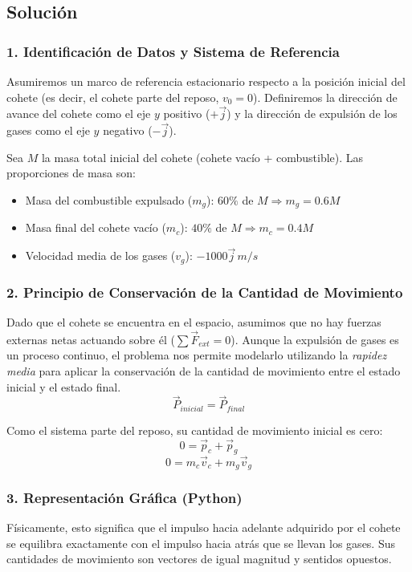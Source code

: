 \documentclass[12pt, a4paper]{article}
\begin{document}
\subsection*{Solución}

\subsubsection*{1. Identificación de Datos y Sistema de Referencia}
Asumiremos un marco de referencia estacionario respecto a la posición inicial del cohete (es decir, el cohete parte del reposo, $v_0 = 0$). Definiremos la dirección de avance del cohete como el eje $y$ positivo ($+\vec{j}$) y la dirección de expulsión de los gases como el eje $y$ negativo ($-\vec{j}$).

Sea $M$ la masa total inicial del cohete (cohete vacío + combustible). Las proporciones de masa son:
\begin{itemize}
    \item Masa del combustible expulsado ($m_g$): $60\%$ de $M \Rightarrow m_g = 0.6 M$
    \item Masa final del cohete vacío ($m_c$): $40\%$ de $M \Rightarrow m_c = 0.4 M$
    \item Velocidad media de los gases ($v_g$): $-1000 \vec{j} \, \si{m/s}$
\end{itemize}

\subsubsection*{2. Principio de Conservación de la Cantidad de Movimiento}
Dado que el cohete se encuentra en el espacio, asumimos que no hay fuerzas externas netas actuando sobre él ($\sum \vec{F}_{ext} = 0$). Aunque la expulsión de gases es un proceso continuo, el problema nos permite modelarlo utilizando la \textit{rapidez media} para aplicar la conservación de la cantidad de movimiento entre el estado inicial y el estado final.
\[ \vec{P}_{inicial} = \vec{P}_{final} \]

Como el sistema parte del reposo, su cantidad de movimiento inicial es cero:
\[ 0 = \vec{p}_c + \vec{p}_g \]
\[ 0 = m_c \vec{v}_c + m_g \vec{v}_g \]

\subsubsection*{3. Representación Gráfica (Python)}
Físicamente, esto significa que el impulso hacia adelante adquirido por el cohete se equilibra exactamente con el impulso hacia atrás que se llevan los gases. Sus cantidades de movimiento son vectores de igual magnitud y sentidos opuestos.
\end{document}
